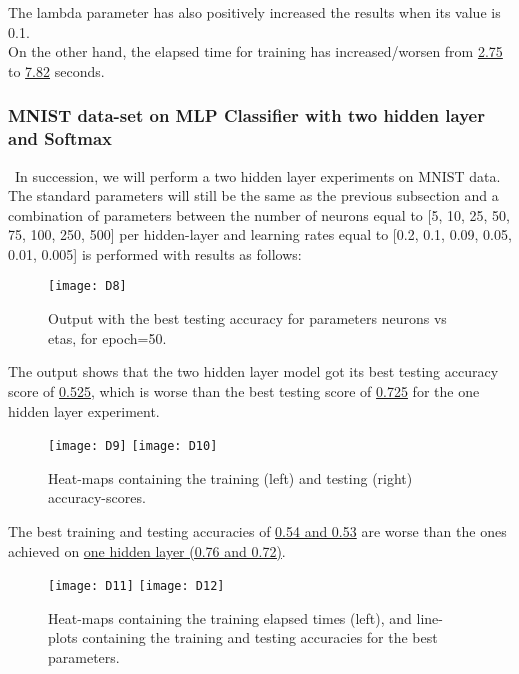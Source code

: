 The lambda parameter has also positively increased the results when its value is 0.1.\\

On the other hand, the elapsed time for training has increased/worsen from \hyperref[fig:D3]{2.75} to \hyperref[fig:D3]{7.82} seconds.

\subsubsection{MNIST data-set on MLP Classifier with two hidden layer and Softmax}
\label{chap:MNIST data-set on MLP Classifier with two hidden layer and Softmax}

\quad \, In succession, we will perform a two hidden layer experiments on MNIST data. The standard parameters will still be the same as the previous subsection and a combination of parameters between the number of neurons equal to [5, 10, 25, 50, 75, 100, 250, 500] per hidden-layer and learning rates equal to [0.2, 0.1, 0.09, 0.05, 0.01, 0.005] is performed with results as follows:

\begin{figure}[H]
\label{fig:D5}
\centering
\texttt{[image: D8]}
\caption{Output with the best testing accuracy for parameters neurons vs etas, for epoch=50.}
\end{figure}

The output shows that the two hidden layer model got its best testing accuracy score of \hyperref[fig:D5]{0.525}, which is worse than the best testing score of \hyperref[fig:D0]{0.725} for the one hidden layer experiment.

\begin{figure}[H]
\label{fig:D6}
\centering
\texttt{[image: D9]}
\texttt{[image: D10]}
\caption{Heat-maps containing the training (left) and testing (right) accuracy-scores.}
\end{figure}

The best training and testing accuracies of \hyperref[fig:D6]{0.54 and 0.53} are worse than the ones achieved on \hyperref[fig:D2]{one hidden layer (0.76 and 0.72)}.

\begin{figure}[H]
\label{fig:D7}
\centering
\texttt{[image: D11]}
\texttt{[image: D12]}
\caption{Heat-maps containing the training elapsed times (left), and line-plots containing the training and testing accuracies for the best parameters.}
\end{figure}

